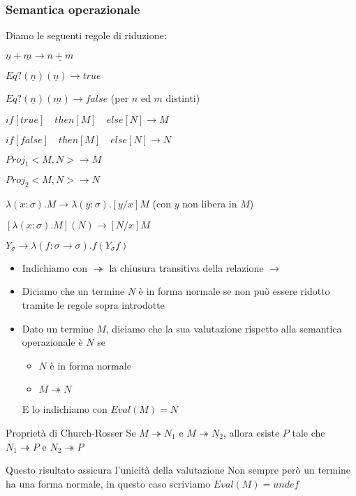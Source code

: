 \documentclass{beamer}
\begin{document}
\begin{frame}
	
	\frametitle{Semantica operazionale}
	
	Diamo le seguenti regole di riduzione:
	\begin{description}
		\item[add] $\underline{n}+\underline{m} \rightarrow \underline{n+m}$
		\item[Eq?] $Eq?(\underline{n})(\underline{n})\rightarrow true$
		\item $Eq?(\underline{n})(\underline{m})\rightarrow false$ (per $n$ ed $m$ distinti)
		\item[cond] $if[true]\quad then[M]\quad else[N] \rightarrow M$
		\item $if[false]\quad then[M]\quad else[N] \rightarrow N$
		\item[proj] $Proj_1<M,N> \rightarrow M$
		\item $Proj_2<M,N> \rightarrow N$
		\item[$\alpha$] $\lambda (x:\sigma).M \rightarrow \lambda (y:\sigma).[y/x]M$ (con $y$ non libera in $M$)
		\item[$\beta$] $[\lambda(x:\sigma).M](N) \rightarrow [N/x]M$
		\item[$Y$] $Y_{\sigma} \rightarrow \lambda (f:\sigma \rightarrow \sigma).f(Y_{\sigma}f)$
	\end{description}
	
\end{frame}

\begin{frame}
	\begin{itemize}
		\item Indichiamo con $\twoheadrightarrow$ la chiusura transitiva della relazione $\rightarrow$
		\item Diciamo che un termine $N$ è in forma normale se non può essere ridotto tramite le regole sopra introdotte
		\item Dato un termine $M$, diciamo che la sua valutazione rispetto alla semantica operazionale è $N$ se
		\begin{itemize}
			\item $N$ è in forma normale
			\item $M \twoheadrightarrow N$
		\end{itemize}
		E lo indichiamo con $Eval(M)=N$
	\end{itemize}
	
	\begin{block}{Proprietà di Church-Rosser}
		Se $M \twoheadrightarrow N_1$ e $M \twoheadrightarrow N_2$, allora esiste $P$ tale che $N_1 \twoheadrightarrow P$ e $N_2 \twoheadrightarrow P$
	\end{block}
	
	Questo risultato assicura l'unicità della valutazione
	Non sempre però un termine ha una forma normale, in questo caso scriviamo $Eval(M)=undef$
	
\end{frame}
\end{document}
